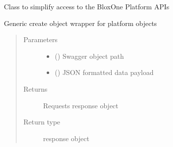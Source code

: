\documentclass[letterpaper,10pt,english]{sphinxmanual}
\begin{document}
\begin{fulllineitems}
\label{\detokenize{b1sw-class:bloxone.b1sw}}
\sphinxAtStartPar
Class to simplify access to the BloxOne Platform APIs

\begin{fulllineitems}
\label{\detokenize{b1sw-class:bloxone.b1sw.create}}
\sphinxAtStartPar
Generic create object wrapper for platform objects
\begin{quote}\begin{description}
\item[{Parameters}] \leavevmode\begin{itemize}
\item {} 
\sphinxAtStartPar
{} () \textendash{} Swagger object path

\item {} 
\sphinxAtStartPar
{} () \textendash{} JSON formatted data payload

\end{itemize}

\item[{Returns}] \leavevmode
\sphinxAtStartPar
Requests response object

\item[{Return type}] \leavevmode
\sphinxAtStartPar
response object

\end{description}\end{quote}

\end{fulllineitems}



\end{fulllineitems}
\end{document}

